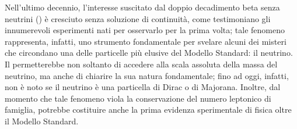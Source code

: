 




Nell'ultimo decennio, l'interesse suscitato dal doppio decadimento beta senza neutrini (\doppiobeta) è cresciuto senza soluzione di continuità, come testimoniano gli innumerevoli esperimenti nati per osservarlo per la prima volta; tale fenomeno rappresenta, infatti, uno strumento fondamentale per svelare alcuni dei misteri che circondano una delle particelle più elusive del Modello Standard: il neutrino. 
Il \doppiobeta{} permetterebbe non soltanto di accedere alla scala assoluta della massa del neutrino, ma anche di chiarire la sua natura fondamentale; fino ad oggi, infatti, non è noto se il neutrino è una particella di Dirac o di Majorana. 
Inoltre, dal momento che tale fenomeno viola la conservazione del numero leptonico di famiglia, potrebbe costituire anche la prima evidenza sperimentale di fisica oltre il Modello Standard.

